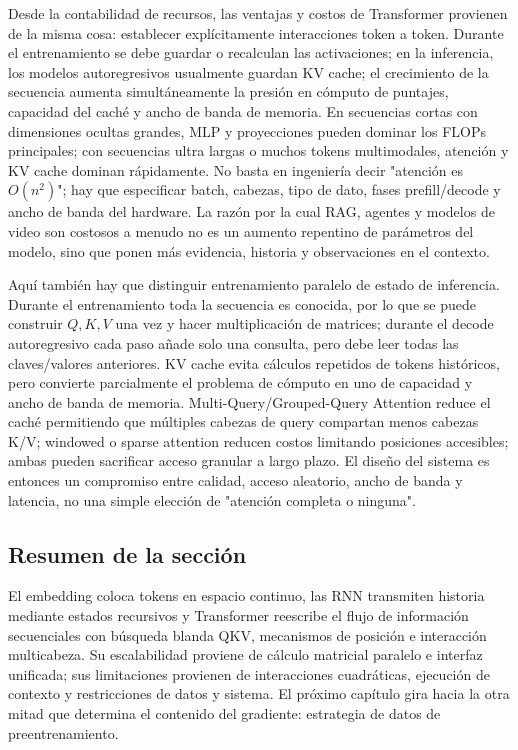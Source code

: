 Desde la contabilidad de recursos, las ventajas y costos de Transformer provienen de la misma cosa: establecer explícitamente interacciones token a token. Durante el entrenamiento se debe guardar o recalculan las activaciones; en la inferencia, los modelos autoregresivos usualmente guardan KV cache; el crecimiento de la secuencia aumenta simultáneamente la presión en cómputo de puntajes, capacidad del caché y ancho de banda de memoria. En secuencias cortas con dimensiones ocultas grandes, MLP y proyecciones pueden dominar los FLOPs principales; con secuencias ultra largas o muchos tokens multimodales, atención y KV cache dominan rápidamente. No basta en ingeniería decir "atención es $O(n^2)$"; hay que especificar batch, cabezas, tipo de dato, fases prefill/decode y ancho de banda del hardware. La razón por la cual RAG, agentes y modelos de video son costosos a menudo no es un aumento repentino de parámetros del modelo, sino que ponen más evidencia, historia y observaciones en el contexto.

Aquí también hay que distinguir entrenamiento paralelo de estado de inferencia. Durante el entrenamiento toda la secuencia es conocida, por lo que se puede construir $Q,K,V$ una vez y hacer multiplicación de matrices; durante el decode autoregresivo cada paso añade solo una consulta, pero debe leer todas las claves/valores anteriores. KV cache evita cálculos repetidos de tokens históricos, pero convierte parcialmente el problema de cómputo en uno de capacidad y ancho de banda de memoria. Multi-Query/Grouped-Query Attention reduce el caché permitiendo que múltiples cabezas de query compartan menos cabezas K/V; windowed o sparse attention reducen costos limitando posiciones accesibles; ambas pueden sacrificar acceso granular a largo plazo. El diseño del sistema es entonces un compromiso entre calidad, acceso aleatorio, ancho de banda y latencia, no una simple elección de "atención completa o ninguna".

\subsection{Resumen de la sección}

El embedding coloca tokens en espacio continuo, las RNN transmiten historia mediante estados recursivos y Transformer reescribe el flujo de información secuenciales con búsqueda blanda QKV, mecanismos de posición e interacción multicabeza. Su escalabilidad proviene de cálculo matricial paralelo e interfaz unificada; sus limitaciones provienen de interacciones cuadráticas, ejecución de contexto y restricciones de datos y sistema. El próximo capítulo gira hacia la otra mitad que determina el contenido del gradiente: estrategia de datos de preentrenamiento.

